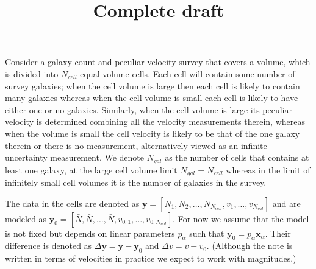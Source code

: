 \documentclass{article}
\title{Complete draft}
\begin{document}
\maketitle



Consider a galaxy count and peculiar velocity survey that covers a volume, which is divided into $N_{cell}$ equal-volume cells.  Each cell will contain some
number of survey galaxies; when the cell volume is large then each cell is likely to contain many galaxies whereas when the cell volume is small each cell is likely
to have either one or no galaxies.  Similarly, when the cell volume is large  its  peculiar velocity is determined combining all the velocity measurements therein,
whereas when the volume is small the cell velocity is likely to be that of the one galaxy therein or there is no measurement, alternatively viewed as an infinite
uncertainty measurement.  We denote $N_{gal}$ as the number of cells that contains at least one galaxy, at the large cell volume limit
$N_{gal}=N_{cell}$ whereas in the limit of infinitely small cell volumes it is
the number of galaxies in the survey.

The data in the cells are denoted as $\textbf{y} = [N_1, N_2, \hdots, N_{N_{cell}}, v_1, \hdots, v_{N_{gal}}]$
and are modeled as $\textbf{y}_0 =[\bar{N}, \bar{N}, \hdots, \bar{N}, v_{0,1}, \hdots, v_{0,N_{gal}}]$.  For now we assume that the model is not fixed but depends
on linear parameters $p_\alpha$ such that
 $\textbf{y}_0 = p_\alpha \textbf{x}_\alpha$.
Their difference is  denoted as $\Delta \textbf{y}= \textbf{y} - \textbf{y}_0 $ and $\Delta v= v-v_0$.  (Although the note is written in terms of velocities
in practice we expect to work with magnitudes.)
\end{document}
